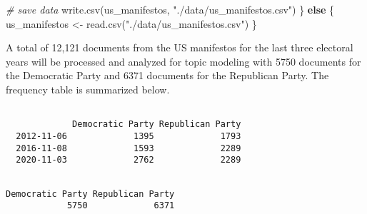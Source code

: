 \documentclass[
]{article}
\newenvironment{Shaded}{\begin{snugshade}}{\end{snugshade}}
\newcommand{\CommentTok}[1]{\textcolor[rgb]{0.56,0.35,0.01}{\textit{#1}}}
\newcommand{\ControlFlowTok}[1]{\textcolor[rgb]{0.13,0.29,0.53}{\textbf{#1}}}
\newcommand{\FunctionTok}[1]{\textcolor[rgb]{0.00,0.00,0.00}{#1}}
\newcommand{\NormalTok}[1]{#1}
\newcommand{\OtherTok}[1]{\textcolor[rgb]{0.56,0.35,0.01}{#1}}
\newcommand{\SpecialCharTok}[1]{\textcolor[rgb]{0.00,0.00,0.00}{#1}}
\newcommand{\StringTok}[1]{\textcolor[rgb]{0.31,0.60,0.02}{#1}}
\begin{document}
\begin{Shaded}
\begin{Highlighting}[]
  \CommentTok{\# save data}
  \FunctionTok{write.csv}\NormalTok{(us\_manifestos, }\StringTok{"./data/us\_manifestos.csv"}\NormalTok{)}
\NormalTok{\} }\ControlFlowTok{else}\NormalTok{ \{}
\NormalTok{  us\_manifestos }\OtherTok{\textless{}{-}} \FunctionTok{read.csv}\NormalTok{(}\StringTok{"./data/us\_manifestos.csv"}\NormalTok{)}
\NormalTok{\}}
\end{Highlighting}
\end{Shaded}

A total of 12,121 documents from the US manifestos for the last three
electoral years will be processed and analyzed for topic modeling with
5750 documents for the Democratic Party and 6371 documents for the
Republican Party. The frequency table is summarized below.

\begin{Shaded}
\end{Shaded}

\begin{verbatim}
            
             Democratic Party Republican Party
  2012-11-06             1395             1793
  2016-11-08             1593             2289
  2020-11-03             2762             2289
\end{verbatim}

\begin{Shaded}
\end{Shaded}

\begin{verbatim}

Democratic Party Republican Party 
            5750             6371 
\end{verbatim}
\end{document}
